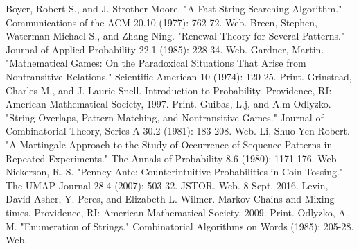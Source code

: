 \documentclass{article}
\numberwithin{mytheorem}{subsection} %
\begin{document}
	\begin{thebibliography}{1}
			Boyer, Robert S., and J. Strother Moore. "A Fast String Searching Algorithm." Communications of the ACM 20.10 (1977): 762-72. Web. 
			Breen, Stephen, Waterman Michael S., and Zhang Ning. "Renewal Theory for Several Patterns." Journal of Applied Probability 22.1 (1985): 228-34. Web.
			Gardner, Martin. "Mathematical Games: On the Paradoxical Situations That Arise from Nontransitive Relations." Scientific American 10 (1974): 120-25. Print.
 			Grinstead, Charles M., and J. Laurie Snell. Introduction to Probability. Providence, RI: American Mathematical Society, 1997. Print. 
			Guibas, L.j, and A.m Odlyzko. "String Overlaps, Pattern Matching, and Nontransitive Games." Journal of Combinatorial Theory, Series A 30.2 (1981): 183-208. Web.
			Li, Shuo-Yen Robert. "A Martingale Approach to the Study of Occurrence of Sequence Patterns in Repeated Experiments." The Annals of Probability 8.6 (1980): 1171-176. Web.
			Nickerson, R. S. "Penney Ante: Counterintuitive Probabilities in Coin Tossing." The UMAP Journal 28.4 (2007): 503-32. JSTOR. Web. 8 Sept. 2016. 
			Levin, David Asher, Y. Peres, and Elizabeth L. Wilmer. Markov Chains and Mixing times. Providence, RI: American Mathematical Society, 2009. Print. 
			Odlyzko, A. M. "Enumeration of Strings." Combinatorial Algorithms on Words (1985): 205-28. Web.
			
	\end{thebibliography}
\end{document}
